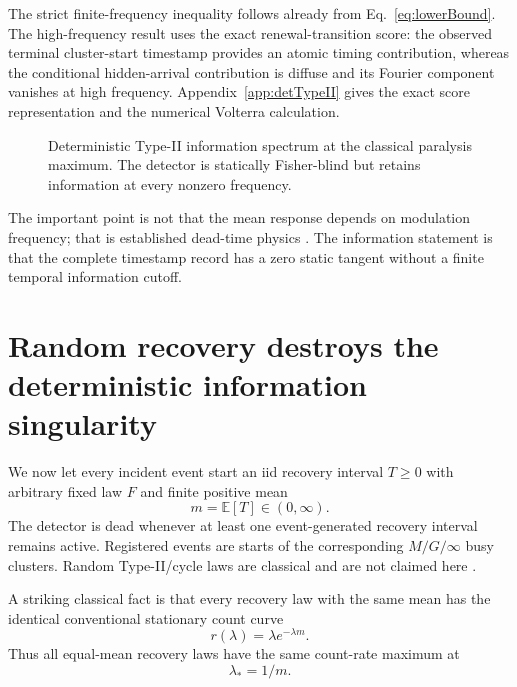 \documentclass[aps,prapplied,preprint,nofootinbib]{revtex4-2}
\newcommand{\E}{\mathbb E}
\begin{document}
The strict finite-frequency inequality follows already from Eq.~\eqref{eq:lowerBound}. The high-frequency result uses the exact renewal-transition score: the observed terminal cluster-start timestamp provides an atomic timing contribution, whereas the conditional hidden-arrival contribution is diffuse and its Fourier component vanishes at high frequency. Appendix~\ref{app:detTypeII} gives the exact score representation and the numerical Volterra calculation.

\begin{figure}[t]
\centering
{}
\caption{Deterministic Type-II information spectrum at the classical paralysis maximum. The detector is statically Fisher-blind but retains information at every nonzero frequency.}
\label{fig:typeIIspectrum}
\end{figure}

The important point is not that the mean response depends on modulation frequency; that is established dead-time physics \cite{TeichVannucci1978,VannucciTeich1978}. The information statement is that the complete timestamp record has a zero static tangent without a finite temporal information cutoff.

\section{Random recovery destroys the deterministic information singularity}
\label{sec:randomRecovery}

We now let every incident event start an iid recovery interval $T\ge0$ with arbitrary fixed law $F$ and finite positive mean
\begin{equation}
m=\E[T]\in(0,\infty).
\end{equation}
The detector is dead whenever at least one event-generated recovery interval remains active. Registered events are starts of the corresponding $M/G/\infty$ busy clusters. Random Type-II/cycle laws are classical and are not claimed here \cite{DvurecenskijOsoskov1984,DvurecenskijOsoskov1985}.

A striking classical fact is that every recovery law with the same mean has the identical conventional stationary count curve
\begin{equation}
\boxed{
r(\lambda)=\lambda e^{-\lambda m}.
}
\label{eq:universalCurve}
\end{equation}
Thus all equal-mean recovery laws have the same count-rate maximum at
\begin{equation}
\lambda_*=1/m.
\end{equation}
\end{document}
